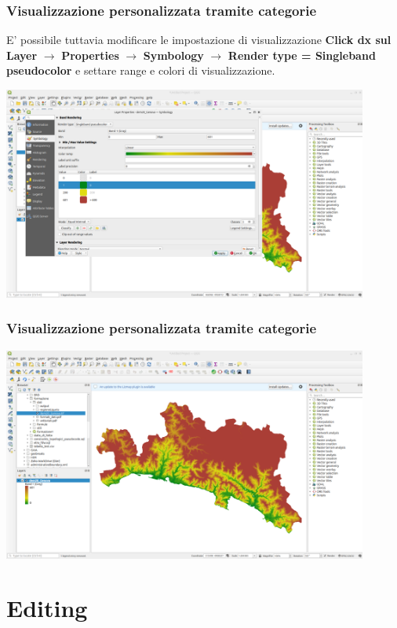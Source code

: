 \documentclass{beamer}
\begin{document}
{\begin{frame}
  \frametitle{Visualizzazione personalizzata tramite categorie}
    E' possibile tuttavia modificare le impostazione di visualizzazione \textbf{Click dx sul Layer} $\rightarrow$ \textbf{Properties} $\rightarrow$ \textbf{Symbology} $\rightarrow$ \textbf{Render type = Singleband pseudocolor} e settare range e colori di visualizzazione.
		    \begin{center}
			\includegraphics[width=0.90\textwidth] {digitizing_pics/categories.png}
		    \end{center}
\end{frame}

\begin{frame}
  \frametitle{Visualizzazione personalizzata tramite categorie}

		    \begin{center}
			\includegraphics[width=0.90\textwidth] {digitizing_pics/categories2.png}
		    \end{center}
\end{frame} 


\section{Editing}

}
\end{document}
